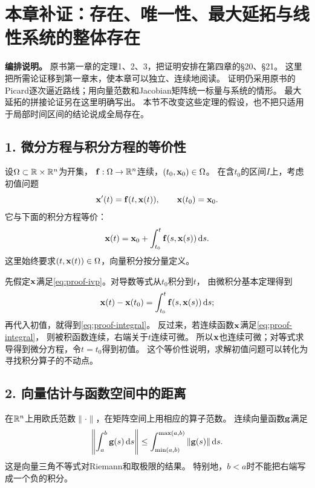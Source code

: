 \section*{本章补证：存在、唯一性、最大延拓与线性系统的整体存在}
\label{sec:existence-proofs}

\noindent\textbf{编排说明。}
原书第一章的定理1、2、3，把证明安排在第四章的§20、§21。
这里把所需论证移到第一章末，使本章可以独立、连续地阅读。
证明仍采用原书的Picard逐次逼近路线；用向量范数和Jacobian矩阵统一标量与系统的情形。
最大延拓的拼接论证另在这里明确写出。
本节不改变这些定理的假设，也不把只适用于局部时间区间的结论说成全局存在。

\subsection*{1. 微分方程与积分方程的等价性}

设$\Omega\subset\mathbb R\times\mathbb R^n$为开集，
$\vect{f}:\Omega\to\R^n$连续，$(t_0,\vect{x}_0)\in\Omega$。
在含$t_0$的区间$I$上，考虑初值问题
\begin{equation}
 \vect{x}'(t)=\vect{f}(t,\vect{x}(t)),\qquad \vect{x}(t_0)=\vect{x}_0.
 \label{eq:proof-ivp}
\end{equation}
它与下面的积分方程等价：
\begin{equation}
 \vect{x}(t)=\vect{x}_0+\int_{t_0}^t \vect{f}(s,\vect{x}(s))\,\dd s.
 \label{eq:proof-integral}
\end{equation}
这里始终要求$(t,\vect{x}(t))\in\Omega$，向量积分按分量定义。

先假定$\vect{x}$满足\eqref{eq:proof-ivp}。对导数等式从$t_0$积分到$t$，
由微积分基本定理得到
\[
 \vect{x}(t)-\vect{x}(t_0)=\int_{t_0}^t \vect{f}(s,\vect{x}(s))\,\dd s;
\]
再代入初值，就得到\eqref{eq:proof-integral}。
反过来，若连续函数$\vect{x}$满足\eqref{eq:proof-integral}，
则被积函数连续，右端关于$t$连续可微。
所以$\vect{x}$也连续可微；对等式求导得到微分方程，令$t=t_0$得到初值。
这个等价性说明，求解初值问题可以转化为寻找积分算子的不动点。

\subsection*{2. 向量估计与函数空间中的距离}

在$\mathbb R^n$上用欧氏范数$\|\cdot\|$，在矩阵空间上用相应的算子范数。
连续向量函数$\vect{g}$满足
\[
 \left\|\int_a^b \vect{g}(s)\,\dd s\right\|
 \le \int_{\min(a,b)}^{\max(a,b)}\|\vect{g}(s)\|\,\dd s.
\]
这是向量三角不等式对Riemann和取极限的结果。
特别地，$b<a$时不能把右端写成一个负的积分。

